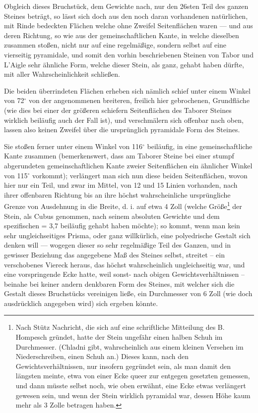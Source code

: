 \documentclass[a4paper, 11pt, oneside, german]{article}
\begin{document}
Obgleich dieses Bruchstück, dem Gewichte nach, nur den 26sten Teil des ganzen Steines beträgt, so lässt sich doch aus den noch daran vorhandenen natürlichen, mit Rinde bedeckten Flächen welche ohne Zweifel Seitenflächen waren --- und aus deren Richtung, so wie aus der gemeinschaftlichen Kante, in welche dieselben zusammen stoßen, nicht nur auf eine regelmäßige, sondern selbst auf eine vierseitig pyramidale, und somit den vorhin beschriebenen Steinen von Tabor und L'Aigle sehr ähnliche Form, welche dieser Stein, als ganz, gehabt haben dürfte, mit aller Wahrscheinlichkeit schließen.

Die beiden überrindeten Flächen erheben sich nämlich schief unter einem Winkel von 72$^{\circ}$ von der angenommenen breiteren, freilich hier gebrochenen, Grundfläche (wie dies bei einer der größeren schiefern Seitenflächen des Taborer Steines wirklich beiläufig auch der Fall ist), und verschmälern sich offenbar nach oben, lassen also keinen Zweifel über die ursprünglich pyramidale Form des Steines.

Sie stoßen ferner unter einem Winkel von 116$^{\circ}$ beiläufig, in eine gemeinschaftliche Kante zusammen (bemerkenswert, dass am Taborer Steine bei einer stumpf abgerundeten gemeinschaftlichen Kante zweier Seitenflächen ein ähnlicher Winkel von 115$^{\circ}$ vorkommt); verlängert man sich nun diese beiden Seitenflächen, wovon hier nur ein Teil, und zwar im Mittel, von 12 und 15 Linien vorhanden, nach ihrer offenbaren Richtung bis an ihre höchst wahrscheinliche ursprüngliche Grenze von Ausdehnung in die Breite, d. i. auf etwa 4 Zoll (welche Größe\footnote{Nach Stütz Nachricht, die sich auf eine schriftliche Mitteilung des B. Hompesch gründet, hatte der Stein ungefähr einen halben Schuh im Durchmesser. (Chladni gibt, wahrscheinlich aus einem kleinen Versehen im Niederschreiben, einen Schuh an.) Dieses kann, nach den Gewichtsverhältnissen, nur insofern gegründet sein, als man damit den längsten meinte, etwa von einer Ecke queer zur entgegen gesetzten gemessen, und dann müsste selbst noch, wie oben erwähnt, eine Ecke etwas verlängert gewesen sein, und wenn der Stein wirklich pyramidal war, dessen Höhe kaum mehr als 3 Zolle betragen haben.} der Stein, als Cubus genommen, nach seinem absoluten Gewichte und dem spezifischen = 3,7 beiläufig gehabt haben möchte); so kommt, wenn man kein sehr ungleichseitiges Prisma, oder ganz willkürlich, eine polyedrische Gestalt sich denken will --- wogegen dieser so sehr regelmäßige Teil des Ganzen, und in gewisser Beziehung das angegebene Maß des Steines selbst, streitet -- ein verschobenes Viereck heraus, das höchst wahrscheinlich ungleichseitig war, und eine vorspringende Ecke hatte, weil sonst- nach obigen Gewichtsverhältnissen -- beinahe bei keiner andern denkbaren Form des Steines, mit welcher sich die Gestalt dieses Bruchstücks vereinigen ließe, ein Durchmesser von 6 Zoll (wie doch ausdrücklich angegeben wird) sich ergeben könnte.
\end{document}
